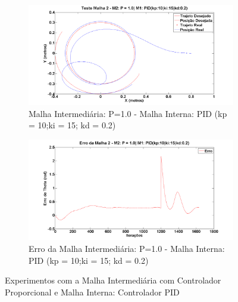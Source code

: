   \begin{figure}[!htb]
  	\centering
  	\begin{subfigure}{1.0\textwidth}
  		\centering
  		\includegraphics[width=.9\linewidth]{./Testes/Malha2/P1.0/PID/PIDPos}
  		\caption{Malha Intermediária: P=1.0 - Malha Interna: PID (kp = 10;ki = 15; kd = 0.2)}
  		\label{fig:m2pidpos}
  	\end{subfigure}
  	\begin{subfigure}{1.0\textwidth}
  		\centering
  		\includegraphics[width=.9\linewidth]{./Testes/Malha2/P1.0/PID/ErroThetaPID}
  		\caption{Erro da Malha Intermediária: P=1.0 - Malha Interna: PID (kp = 10;ki = 15; kd = 0.2)}
  		\label{fig:m2pid2pos}
  	\end{subfigure}
  	\caption{Experimentos com a Malha Intermediária com Controlador Proporcional e Malha Interna: Controlador PID}
  	\label{fig:m2pid}
  \end{figure}
  
